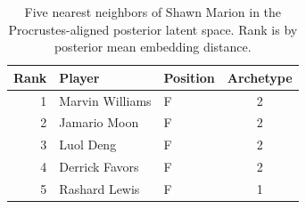 \begin{table}[htbp]
  \centering\small
  \begin{tabular}{rllc}
    \toprule
    Rank & Player & Position & Archetype \\
    \midrule
    1 & Marvin Williams & F & 2 \\
    2 & Jamario Moon & F & 2 \\
    3 & Luol Deng & F & 2 \\
    4 & Derrick Favors & F & 2 \\
    5 & Rashard Lewis & F & 1 \\
    \bottomrule
  \end{tabular}
  \caption{Five nearest neighbors of Shawn Marion in the Procrustes-aligned posterior latent space. Rank is by posterior mean embedding distance.}
  \label{tab:Shawn_Marion_neighbors}
\end{table}

